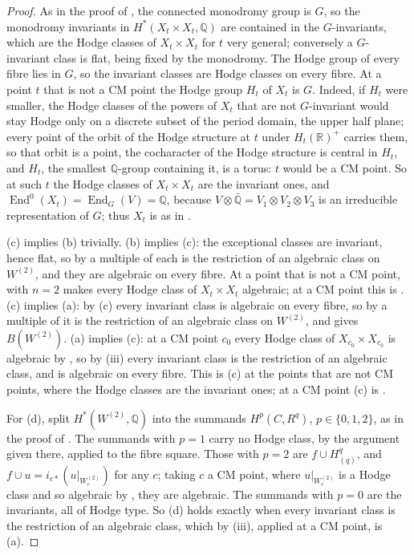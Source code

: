 \documentclass[11pt,reqno]{amsart}
\theoremstyle{plain}
\theoremstyle{definition}
\theoremstyle{remark}
\newcommand{\QQ}{\mathbb{Q}}
\newcommand{\RR}{\mathbb{R}}
\DeclareMathOperator{\End}{End}
\begin{document}
\begin{proof}
As in the proof of , the connected monodromy group
is $G$, so the monodromy invariants in $H^{*}(X_{t}\times X_{t},\QQ)$ are
contained in the $G$-invariants, which are the Hodge classes of
$X_{t}\times X_{t}$ for $t$ very general; conversely a $G$-invariant class is
flat, being fixed by the monodromy. The Hodge group of every fibre lies in
$G$, so the invariant classes are Hodge classes on every fibre. At a point $t$
that is not a CM point the Hodge group $H_{t}$ of $X_{t}$ is $G$. Indeed, if
$H_{t}$ were smaller, the Hodge classes of the powers of $X_{t}$ that are not
$G$-invariant would stay Hodge only on a discrete subset of the period
domain, the upper half plane; every point of the orbit of the Hodge structure
at $t$ under $H_{t}(\RR)^{+}$ carries them, so that orbit is a point, the
cocharacter of the Hodge structure is central in $H_{t}$, and $H_{t}$, the
smallest $\QQ$-group containing it, is a torus: $t$ would be a CM point. So
at such $t$ the Hodge classes of $X_{t}\times X_{t}$ are the invariant ones,
and $\End^{0}(X_{t})=\End_{G}(V)=\QQ$, because
$V\otimes\bar{\QQ}=V_{1}\otimes V_{2}\otimes V_{3}$ is an irreducible
representation of $G$; thus $X_{t}$ is as in .

(c) implies (b) trivially. (b) implies (c): the exceptional classes are
invariant, hence flat, so by  a multiple of each is the
restriction of an algebraic class on $W^{(2)}$, and they are algebraic on
every fibre. At a point that is not a CM point,  with
$n=2$ makes every Hodge class of $X_{t}\times X_{t}$ algebraic; at a CM point
this is . (c) implies (a): by (c) every invariant class is
algebraic on every fibre, so by  a multiple of it is the
restriction of an algebraic class on $W^{(2)}$, and
 gives $B(W^{(2)})$. (a) implies (c): at a CM point
$c_{0}$ every Hodge class of $X_{c_{0}}\times X_{c_{0}}$ is algebraic by
, so by (iii) every
invariant class is the restriction of an algebraic class, and is algebraic on
every fibre. This is (c) at the points that are not CM points, where the
Hodge classes are the invariant ones; at a CM point (c) is
.

For (d), split $H^{*}(W^{(2)},\QQ)$ into the summands $H^{p}(C,R^{q})$,
$p\in\{0,1,2\}$, as in the proof of . The summands
with $p=1$ carry no Hodge class, by the argument given there, applied to the
fibre square. Those with $p=2$ are $f\cup H^{q}_{(q)}$, and
$f\cup u=i_{c*}(u|_{W^{(2)}_{c}})$ for any $c$; taking $c$ a CM point, where
$u|_{W^{(2)}_{c}}$ is a Hodge class and so algebraic by ,
they are algebraic. The summands with $p=0$ are the invariants, all of Hodge
type. So (d) holds exactly when every invariant class is the restriction of an
algebraic class, which by (iii), applied at a
CM point, is (a).
\end{proof}
\end{document}
